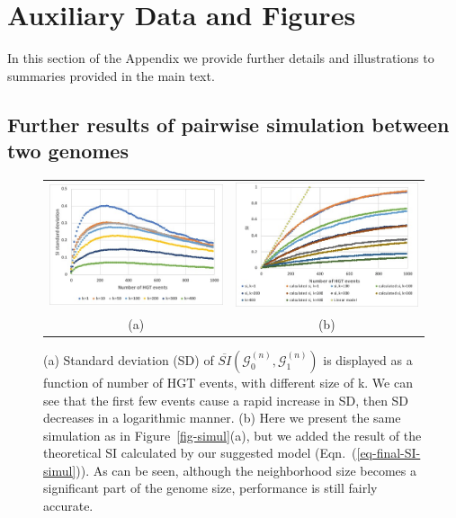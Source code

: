 \documentclass[runningheads, 11pt]{llncs}
\newcommand{\G}{\mathcal{G}^{(n)}}
\begin{document}
\section{Auxiliary Data and Figures}
In this section of the Appendix we provide further details and illustrations to
summaries provided in the main text.

\subsection{Further results of pairwise simulation between two
genomes}\label{sec-append-pw}

\begin{figure}[h]
\begin{center}

\begin{tabular}{cc}
\hspace{-1.5cm}
\includegraphics[width = 3.5in,angle=0]{figs/simul-sd.jpg} &
\includegraphics[width = 3.7in,angle=0]{figs/simul-vs-model.jpg} \\
 (a) & %
 (b) 
\end{tabular}
\caption{\small (a) Standard deviation (SD) of $\overline{SI}(\G_0, \G_1)$ is
displayed as a function of number of HGT events, with different size of k. We
can see that the first few events cause a rapid increase in SD, then SD
decreases in a logarithmic manner.
(b) Here we present the same simulation as in Figure~\ref{fig-simul}(a), but we
added the result of the theoretical SI calculated by our suggested model
(Eqn.~(\ref{eq-final-SI-simul})). As can be seen, although the neighborhood size
becomes a significant part of the genome size, performance is still fairly
accurate. 
\label{fig-simul-vs-model}}
 \end{center}
\end{figure}
\end{document}
